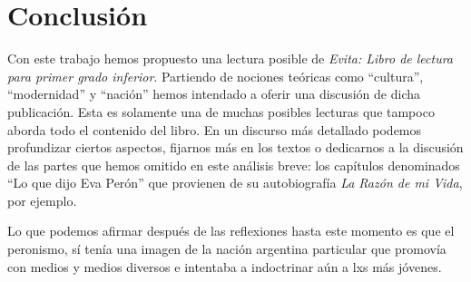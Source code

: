 \section{Conclusión}

Con este trabajo hemos propuesto una lectura posible de \textit{Evita: Libro de lectura para primer grado inferior}.
Partiendo de nociones teóricas como ``cultura'', ``modernidad'' y ``nación'' hemos intendado a oferir una discusión de dicha publicación.
Esta es solamente una de muchas posibles lecturas que tampoco aborda todo el contenido del libro.
En un discurso más detallado podemos profundizar ciertos aspectos, fijarnos más en los textos o dedicarnos a la discusión de las partes que hemos omitido en este análisis breve:
los capítulos denominados ``Lo que dijo Eva Perón'' que provienen de su autobiografía \textit{La Razón de mi Vida}, por ejemplo.

Lo que podemos afirmar después de las reflexiones hasta este momento es que el peronismo, sí tenía una imagen de la nación argentina particular que promovía con medios y medios diversos e intentaba a indoctrinar aún a lxs más jóvenes.

